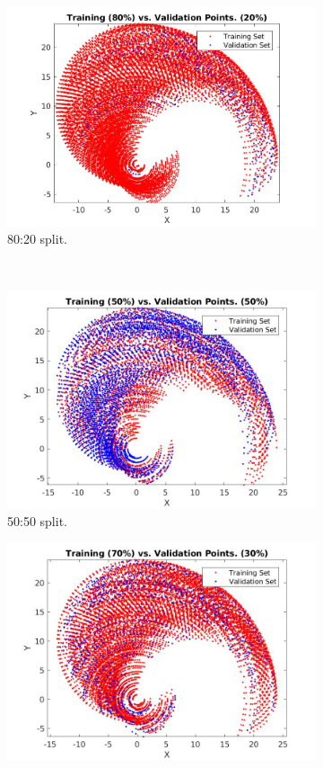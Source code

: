 \documentclass[a4paper, oneside, 12pt]{article}
\begin{document}
\begin{figure}[H]  %
	\centering
	\begin{subfigure}{0.48\textwidth}
		\includegraphics[width=1\textwidth]{trnvsval80.jpg}
		\caption{80:20 split.}
		\label{fig::1a}
	\end{subfigure}
	~
	\begin{subfigure}{0.48\textwidth}
		\includegraphics[width=1\textwidth]{trnvsval50.jpg}
		\caption{50:50 split.}
		\label{fig::1b}
	\end{subfigure}	
	\begin{subfigure}{0.48\textwidth}
		\includegraphics[width=1\textwidth]{trnvsval70.jpg}

\end{subfigure}
\end{figure}
\end{document}
